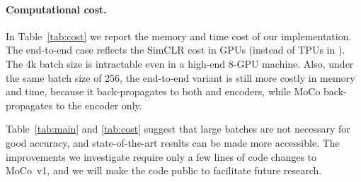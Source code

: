 \documentclass[10pt,twocolumn,letterpaper]{article}
\begin{document}
\paragraph{Computational cost.}
In Table~\ref{tab:cost} we report the memory and time cost of our implementation.
The end-to-end case reflects the SimCLR cost in GPUs (instead of TPUs in \cite{Chen2020}). 
The 4k batch size is intractable even in a high-end 8-GPU machine.
Also, under the same batch size of 256, the end-to-end variant is still more costly in memory and time, because it back-propagates to both  and  encoders, while MoCo back-propagates to the  encoder only.

\vspace{1em}
Table~\ref{tab:main} and \ref{tab:cost} suggest that large batches are not necessary for good accuracy, and state-of-the-art results can be made more accessible.
The improvements we investigate require only a few lines of code changes to MoCo~v1, and we will make the code public to facilitate future research.


{\small


}
\end{document}
